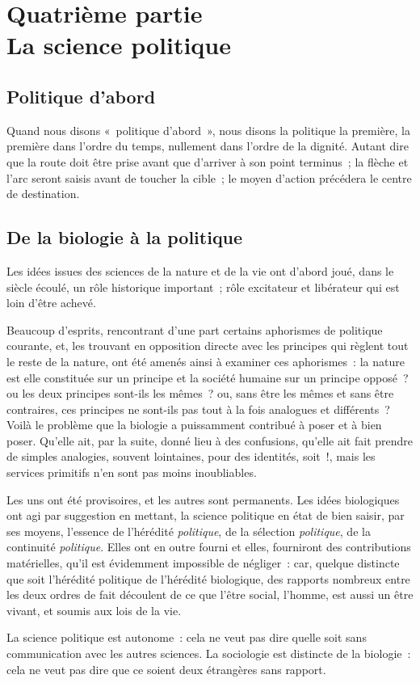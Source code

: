 \documentclass[french,twoside]{book} %
\newcommand\chapteropen{} %
\newcommand\chaptercont{} %
\begin{document}
\chapteropen
\chapter[Quatrième partie. La science politique]{Quatrième partie \\
La science politique}\renewcommand{\leftmark}{Quatrième partie \\
La science politique}


\chaptercont
\section[Politique d’abord]{Politique d’abord}
\noindent Quand nous disons « politique d’abord », nous disons la politique la première, la première dans l’ordre du temps, nullement dans l’ordre de la dignité. Autant dire que la route doit être prise avant que d’arriver à son point terminus ; la flèche et l’arc seront saisis avant de toucher la cible ; le moyen d’action précédera le centre de destination.
\section[De la biologie à la politique]{De la biologie à la politique}
\noindent Les idées issues des sciences de la nature et de la vie ont d’abord joué, dans le siècle écoulé, un rôle historique important ; rôle excitateur et libérateur qui est loin d’être achevé.\par
Beaucoup d’esprits, rencontrant d’une part certains aphorismes de politique courante, et, les trouvant en opposition directe avec les principes qui règlent tout le reste de la nature, ont été amenés ainsi à examiner ces aphorismes : la nature est elle constituée sur un principe et la société humaine sur un principe opposé ? ou les deux principes sont-ils les mêmes ? ou, sans être les mêmes et sans être contraires, ces principes ne sont-ils pas tout à la fois analogues et différents ? Voilà le problème que la biologie a puissamment contribué à poser et à bien poser. Qu’elle ait, par la suite, donné lieu à des confusions, qu’elle ait fait prendre de simples analogies, souvent lointaines, pour des identités, soit !, mais les services primitifs n’en sont pas moins inoubliables.\par
Les uns ont été provisoires, et les autres sont permanents. Les idées biologiques ont agi par suggestion en mettant, la science politique en état de bien saisir, par ses moyens, l’essence de l’hérédité \emph{politique}, de la sélection \emph{politique}, de la continuité \emph{politique}. Elles ont en outre fourni et elles, fourniront des contributions matérielles, qu’il est évidemment impossible de négliger : car, quelque distincte que soit l’hérédité politique de l’hérédité biologique, des rapports nombreux entre les deux ordres de fait découlent de ce que l’être social, l’homme, est aussi un être vivant, et soumis aux lois de la vie.\par
La science politique est autonome : cela ne veut pas dire quelle soit sans communication avec les autres sciences. La sociologie est distincte de la biologie : cela ne veut pas dire que ce soient deux étrangères sans rapport.\par
\end{document}
